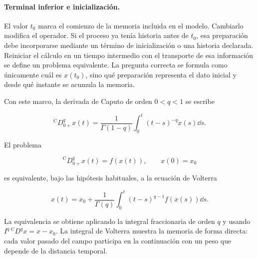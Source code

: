 
\paragraph{Terminal inferior e inicialización.}
El valor $t_0$ marca el comienzo de la memoria
incluida en el modelo. Cambiarlo modifica el operador. Si el proceso ya tenía historia
antes de $t_0$, esa preparación debe incorporarse mediante un término de
inicialización o una historia declarada. Reiniciar el cálculo en un tiempo intermedio
con el transporte de esa información se define un problema equivalente. La pregunta correcta se formula como
únicamente cuál es $x(t_0)$, sino qué preparación representa el dato inicial y desde
qué instante se acumula la memoria.


Con este marco, la derivada de Caputo de orden $0<q<1$ se escribe

\begin{equation}
 {}^{\mathrm C}D_{0+}^{q}x(t)
 =\frac{1}{\Gamma(1-q)}
 \int_0^t(t-s)^{-q}\dot x(s)\dd s.
 \label{eq:gt-caputo}
\end{equation}

El problema

\begin{equation}
 {}^{\mathrm C}D_{0+}^{q}x(t)=f(x(t)),\qquad x(0)=x_0
 \label{eq:gt-pvi-caputo}
\end{equation}

es equivalente, bajo las hipótesis habituales, a la ecuación de Volterra

\begin{equation}
 x(t)=x_0+\frac{1}{\Gamma(q)}
 \int_0^t(t-s)^{q-1}f(x(s))\dd s.
 \label{eq:gt-volterra}
\end{equation}

La equivalencia se obtiene aplicando la integral fraccionaria de orden $q$ y usando
$I^q\,{}^{\mathrm C}D^qx=x-x_0$. La integral de Volterra muestra la memoria de forma
directa: cada valor pasado del campo participa en la continuación con un peso que
depende de la distancia temporal.


